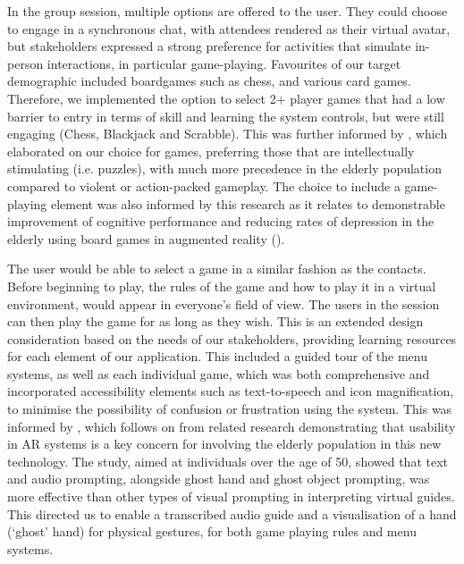 \documentclass[12pt,a4paper]{article}
\begin{document}
In the group session, multiple options are offered to the user. They could choose to engage in a synchronous chat, with attendees rendered as their virtual avatar, but stakeholders expressed a strong preference for activities that simulate in-person interactions, in particular game-playing. Favourites of our target demographic included boardgames such as chess, and various card games. Therefore, we implemented the option to select 2+ player games that had a low barrier to entry in terms of skill and learning the system controls, but were still engaging (Chess, Blackjack and Scrabble). This was further informed by \cite{Chen_2020}, which elaborated on our choice for games, preferring those that are intellectually stimulating (i.e. puzzles), with much more precedence in the elderly population compared to violent or action-packed gameplay. The choice to include a game-playing element was also informed by this research as it relates to demonstrable improvement of cognitive performance and reducing rates of depression in the elderly using board games in augmented reality (\cite{CogARC2024}).

The user would be able to select a game in a similar fashion as the contacts. Before beginning to play, the rules of the game and how to play it in a virtual environment, would appear in everyone’s field of view. The users in the session can then play the game for as long as they wish. This is an extended design consideration based on the needs of our stakeholders, providing learning resources for each element of our application. This included a guided tour of the menu systems, as well as each individual game, which was both comprehensive and incorporated accessibility elements such as text-to-speech and icon magnification, to minimise the possibility of confusion or frustration using the system. This was informed by \cite{Thomas_2021}, which follows on from related research demonstrating that usability in AR systems is a key concern for involving the elderly population in this new technology. The study, aimed at individuals over the age of 50, showed that text and audio prompting, alongside ghost hand and ghost object prompting, was more effective than other types of visual prompting in interpreting virtual guides. This directed us to enable a transcribed audio guide and a visualisation of a hand (‘ghost’ hand) for physical gestures, for both game playing rules and menu systems. 
\end{document}
